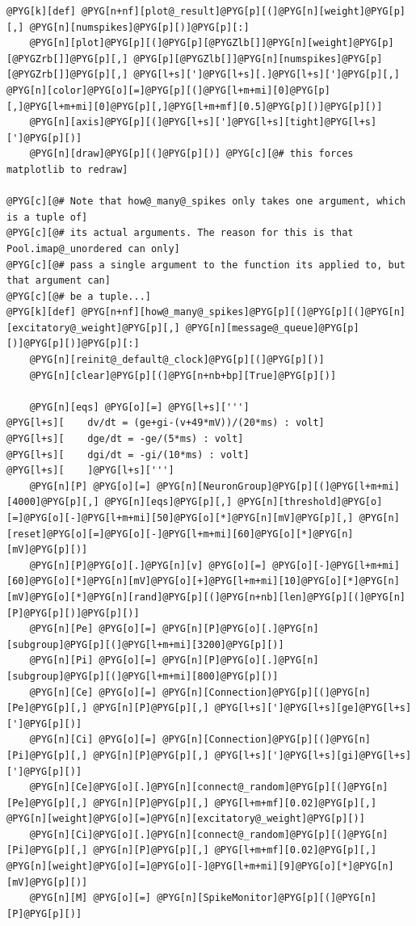 \documentclass[letterpaper,10pt,english]{manual}
\begin{document}
\begin{Verbatim}[commandchars=@\[\]]
@PYG[k][def] @PYG[n+nf][plot@_result]@PYG[p][(]@PYG[n][weight]@PYG[p][,] @PYG[n][numspikes]@PYG[p][)]@PYG[p][:]
    @PYG[n][plot]@PYG[p][(]@PYG[p][@PYGZlb[]]@PYG[n][weight]@PYG[p][@PYGZrb[]]@PYG[p][,] @PYG[p][@PYGZlb[]]@PYG[n][numspikes]@PYG[p][@PYGZrb[]]@PYG[p][,] @PYG[l+s][']@PYG[l+s][.]@PYG[l+s][']@PYG[p][,] @PYG[n][color]@PYG[o][=]@PYG[p][(]@PYG[l+m+mi][0]@PYG[p][,]@PYG[l+m+mi][0]@PYG[p][,]@PYG[l+m+mf][0.5]@PYG[p][)]@PYG[p][)]
    @PYG[n][axis]@PYG[p][(]@PYG[l+s][']@PYG[l+s][tight]@PYG[l+s][']@PYG[p][)]
    @PYG[n][draw]@PYG[p][(]@PYG[p][)] @PYG[c][@# this forces matplotlib to redraw]

@PYG[c][@# Note that how@_many@_spikes only takes one argument, which is a tuple of]
@PYG[c][@# its actual arguments. The reason for this is that Pool.imap@_unordered can only]
@PYG[c][@# pass a single argument to the function its applied to, but that argument can]
@PYG[c][@# be a tuple...]
@PYG[k][def] @PYG[n+nf][how@_many@_spikes]@PYG[p][(]@PYG[p][(]@PYG[n][excitatory@_weight]@PYG[p][,] @PYG[n][message@_queue]@PYG[p][)]@PYG[p][)]@PYG[p][:]
    @PYG[n][reinit@_default@_clock]@PYG[p][(]@PYG[p][)]
    @PYG[n][clear]@PYG[p][(]@PYG[n+nb+bp][True]@PYG[p][)]

    @PYG[n][eqs] @PYG[o][=] @PYG[l+s][''']
@PYG[l+s][    dv/dt = (ge+gi-(v+49*mV))/(20*ms) : volt]
@PYG[l+s][    dge/dt = -ge/(5*ms) : volt]
@PYG[l+s][    dgi/dt = -gi/(10*ms) : volt]
@PYG[l+s][    ]@PYG[l+s][''']
    @PYG[n][P] @PYG[o][=] @PYG[n][NeuronGroup]@PYG[p][(]@PYG[l+m+mi][4000]@PYG[p][,] @PYG[n][eqs]@PYG[p][,] @PYG[n][threshold]@PYG[o][=]@PYG[o][-]@PYG[l+m+mi][50]@PYG[o][*]@PYG[n][mV]@PYG[p][,] @PYG[n][reset]@PYG[o][=]@PYG[o][-]@PYG[l+m+mi][60]@PYG[o][*]@PYG[n][mV]@PYG[p][)]
    @PYG[n][P]@PYG[o][.]@PYG[n][v] @PYG[o][=] @PYG[o][-]@PYG[l+m+mi][60]@PYG[o][*]@PYG[n][mV]@PYG[o][+]@PYG[l+m+mi][10]@PYG[o][*]@PYG[n][mV]@PYG[o][*]@PYG[n][rand]@PYG[p][(]@PYG[n+nb][len]@PYG[p][(]@PYG[n][P]@PYG[p][)]@PYG[p][)]
    @PYG[n][Pe] @PYG[o][=] @PYG[n][P]@PYG[o][.]@PYG[n][subgroup]@PYG[p][(]@PYG[l+m+mi][3200]@PYG[p][)]
    @PYG[n][Pi] @PYG[o][=] @PYG[n][P]@PYG[o][.]@PYG[n][subgroup]@PYG[p][(]@PYG[l+m+mi][800]@PYG[p][)]
    @PYG[n][Ce] @PYG[o][=] @PYG[n][Connection]@PYG[p][(]@PYG[n][Pe]@PYG[p][,] @PYG[n][P]@PYG[p][,] @PYG[l+s][']@PYG[l+s][ge]@PYG[l+s][']@PYG[p][)]
    @PYG[n][Ci] @PYG[o][=] @PYG[n][Connection]@PYG[p][(]@PYG[n][Pi]@PYG[p][,] @PYG[n][P]@PYG[p][,] @PYG[l+s][']@PYG[l+s][gi]@PYG[l+s][']@PYG[p][)]
    @PYG[n][Ce]@PYG[o][.]@PYG[n][connect@_random]@PYG[p][(]@PYG[n][Pe]@PYG[p][,] @PYG[n][P]@PYG[p][,] @PYG[l+m+mf][0.02]@PYG[p][,] @PYG[n][weight]@PYG[o][=]@PYG[n][excitatory@_weight]@PYG[p][)]
    @PYG[n][Ci]@PYG[o][.]@PYG[n][connect@_random]@PYG[p][(]@PYG[n][Pi]@PYG[p][,] @PYG[n][P]@PYG[p][,] @PYG[l+m+mf][0.02]@PYG[p][,] @PYG[n][weight]@PYG[o][=]@PYG[o][-]@PYG[l+m+mi][9]@PYG[o][*]@PYG[n][mV]@PYG[p][)]
    @PYG[n][M] @PYG[o][=] @PYG[n][SpikeMonitor]@PYG[p][(]@PYG[n][P]@PYG[p][)]


\end{Verbatim}
\end{document}

